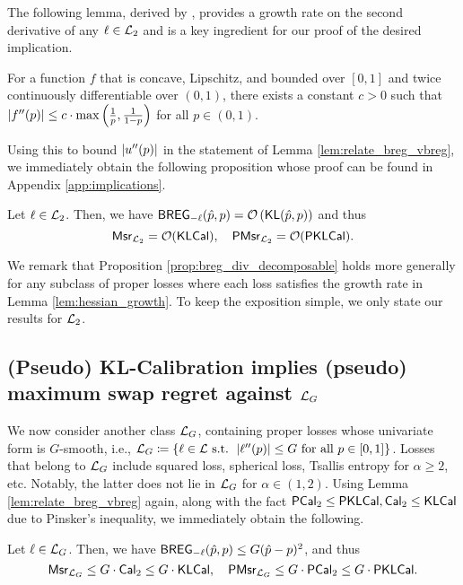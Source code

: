  The following lemma, derived by \cite{luo2024optimal}, provides a growth rate on the second derivative of any $\ell \in \mathcal{L}_{2}$ and is a key ingredient for our proof of the desired implication.
\begin{lemma}\label{lem:hessian_growth}
    For a function $f$ that is concave, Lipschitz, and bounded over $[0, 1]$ and twice continuously differentiable over $(0,1)$, there exists a constant $c > 0$ such that $|f''(p)| \le c \cdot \max\left( \frac{1}{p}, \frac{1}{1 - p} \right)$ for all $p \in (0, 1)$.
\end{lemma}

Using this to bound $\left\lvert u''(p)\right\rvert$ in the statement of Lemma \ref{lem:relate_breg_vbreg}, we immediately obtain the following proposition whose proof can be found in Appendix \ref{app:implications}.



\begin{proposition}\label{prop:breg_div_decomposable}
    Let $\ell \in \mathcal{L}_{2}$. Then, we have $\mathsf{BREG}_{-\ell}(\hat{p}, p) = \mathcal{O}\left( {\mathsf{KL}}(\hat{p}, p \right))$
    and thus $$\mathsf{Msr}_{\mathcal{L}_{2}} = \mathcal{O}(\mathsf{KLCal}), \quad \mathsf{PMsr}_{\mathcal{L}_{2}} = \mathcal{O}(\mathsf{PKLCal}).$$
\end{proposition}
We remark that Proposition \ref{prop:breg_div_decomposable} holds more generally for any subclass of proper losses where each loss satisfies the growth rate in Lemma \ref{lem:hessian_growth}. To keep the exposition simple, we only state our results for $\mathcal{L}_{2}$.


\subsection{(Pseudo) KL-Calibration implies (pseudo) maximum swap regret against $\mathcal{L}_{G}$}\label{subsec:KL-bounds-L-G2}

We now consider another class $\mathcal{L}_{G}$, containing proper losses whose univariate form is $G$-smooth, i.e.,
$\mathcal{L}_{G} \coloneqq \left\{ \ell \in \mathcal{L} \text{ s.t. } \left\lvert\ell''(p)\right\rvert \le G \text{ for all } p \in [0, 1] \right\}$. Losses that belong to $\mathcal{L}_{G}$ include squared loss, spherical loss, Tsallis entropy for $\alpha \ge 2$, etc. Notably, the latter does not lie in $\mathcal{L}_{G}$ for $\alpha \in (1, 2)$.
Using Lemma \ref{lem:relate_breg_vbreg} again, along with the fact 
$\mathsf{PCal}_{2} \le \mathsf{PKLCal}, \mathsf{Cal}_{2} \le \mathsf{KLCal}$ due to Pinsker's inequality,
we immediately obtain the following.

\begin{proposition}
\label{prop:bound_breg_div_quadratically}
    Let $\ell \in \mathcal{L}_{G}$. Then, we have $\mathsf{BREG}_{-\ell}(\hat{p}, p) \le G(\hat{p} - p) ^ {2}$, and thus $$
        \mathsf{Msr}_{\mathcal{L}_{G}} \le  G \cdot \mathsf{Cal}_{2} \le G \cdot \mathsf{KLCal}, \quad \mathsf{PMsr}_{\mathcal{L}_{G}} \le G \cdot \mathsf{PCal}_{2} \le G \cdot \mathsf{PKLCal}.$$
\end{proposition}

